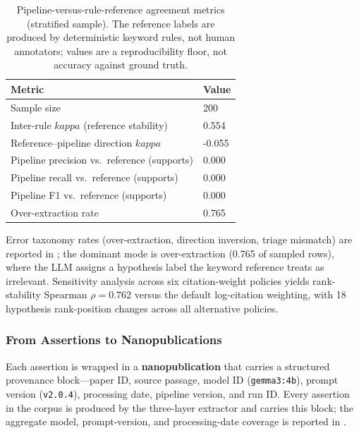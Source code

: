 \documentclass[
  english,
]{article}
\begin{document}
\begin{table}[htbp]
\centering
\caption{Pipeline-versus-rule-reference agreement metrics (stratified sample). The reference labels are produced by deterministic keyword rules, not human annotators; values are a reproducibility floor, not accuracy against ground truth.}
\label{tab:validation_metrics}
\begin{tabular}{ll}
\toprule
\textbf{Metric} & \textbf{Value} \\
\midrule
Sample size & 200 \\
Inter-rule $kappa$ (reference stability) & 0.554 \\
Reference--pipeline direction $kappa$ & -0.055 \\
Pipeline precision vs.\ reference (supports) & 0.000 \\
Pipeline recall vs.\ reference (supports) & 0.000 \\
Pipeline F1 vs.\ reference (supports) & 0.000 \\
Over-extraction rate & 0.765 \\
\bottomrule
\end{tabular}
\end{table}

Error taxonomy rates (over-extraction, direction inversion, triage
mismatch) are reported in
; the dominant mode is
over-extraction (0.765 of sampled rows), where the LLM assigns a
hypothesis label the keyword reference treats as irrelevant. Sensitivity
analysis across six citation-weight policies yields rank-stability
Spearman \(\rho = 0.762\) versus the default log-citation weighting,
with 18 hypothesis rank-position changes across all alternative
policies.

\subsubsection{From Assertions to
Nanopublications}\label{from-assertions-to-nanopublications}

Each assertion is wrapped in a \textbf{nanopublication}
\citep{groth2010anatomy, kuhn2016decentralized} that carries a
structured provenance block---paper ID, source passage, model ID
(\texttt{gemma3:4b}), prompt version (\texttt{v2.0.4}), processing date,
pipeline version, and run ID. Every assertion in the corpus is produced
by the three-layer extractor and carries this block; the aggregate
model, prompt-version, and processing-date coverage is reported in
.
\end{document}
